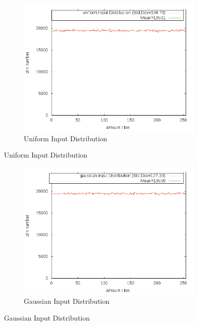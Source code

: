 \documentclass[11pt]{article} %
\begin{document}
\begin{figure}[H]
  \centering
  \begin{subfigure}[b]{0.9\textwidth}
    \includegraphics[width=\textwidth]{Graphs/Dist/Tabulation_uniform_dist.png}
    \caption{Uniform Input Distribution}
    \label{fig:tab_dist_uni}
  \end{subfigure}
\end{figure}
\begin{figure}[H]\ContinuedFloat
  \centering
  \begin{subfigure}[b]{0.9\textwidth}
    \includegraphics[width=\textwidth]{Graphs/Dist/Tabulation_gaussian_dist.png}
    \caption{Gaussian Input Distribution}
    \label{fig:tab_dist_gauss}
  \end{subfigure}
\end{figure}
\end{document}
